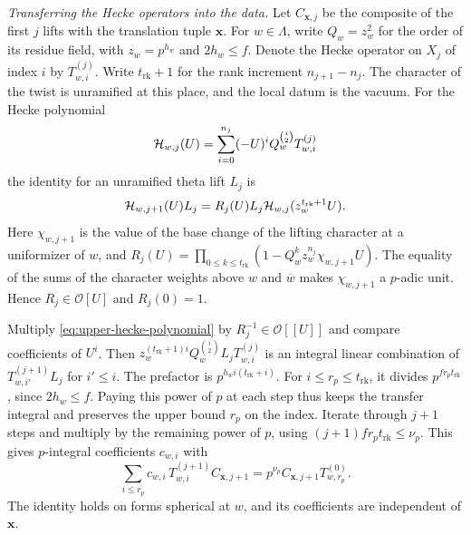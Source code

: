 \emph{Transferring the Hecke operators into the data.}
Let \(C_{\boldsymbol x,j}\) be the composite of the first \(j\) lifts
with the translation tuple \(\boldsymbol x\). For \(w\in\Lambda\),
write \(Q_w=z_w^2\) for the order of its residue field, with
\(z_w=p^{h_w}\) and \(2h_w\le f\). Denote the Hecke operator on
\(X_j\) of index \(i\) by \(T_{w,i}^{(j)}\).
Write \(t_\mathrm{rk}+1\) for the rank increment \(n_{j+1}-n_j\).
The character of the twist is unramified at this place, and the
local datum is the vacuum. For the Hecke polynomial
\[
 {\cal H}_{w,j}(U)=\sum_{i=0}^{n_j}(-U)^i Q_w^{\binom{i}{2}}T_{w,i}^{(j)}
\]
the identity for an unramified theta lift \(L_j\) is
\begin{equation}\label{eq:upper-hecke-polynomial}
 {\cal H}_{w,j+1}(U)L_j
    =R_j(U)L_j{\cal H}_{w,j}(z_w^{t_\mathrm{rk}+1}U).
\end{equation}
Here \(\chi_{w,j+1}\) is the value of the base change of the lifting
character at a uniformizer of \(w\), and
\(R_j(U)=\prod_{0\le k\le t_\mathrm{rk}}(1-Q_w^k z_w^{n_j}\chi_{w,j+1}U)\).
The equality of the sums of the character weights above \(w\) and
\(\overline w\) makes \(\chi_{w,j+1}\) a \(p\)-adic unit.
Hence \(R_j\in\mathcal O[U]\) and \(R_j(0)=1\).

Multiply \eqref{eq:upper-hecke-polynomial} by \(R_j^{-1}\in\mathcal O[[U]]\)
and compare coefficients of \(U^i\).
Then \(z_w^{(t_\mathrm{rk}+1)i}Q_w^{\binom{i}{2}}L_j T_{w,i}^{(j)}\)
is an integral linear combination of \(T_{w,i'}^{(j+1)}L_j\)
for \(i'\le i\).
The prefactor is \(p^{h_w i(t_\mathrm{rk}+i)}\).
For \(i\le r_p\le t_\mathrm{rk}\), it divides \(p^{f r_p t_\mathrm{rk}}\),
since \(2h_w\le f\). Paying this power of \(p\) at each step thus
keeps the transfer integral and preserves the upper bound \(r_p\)
on the index. Iterate through \(j+1\) steps and multiply by the
remaining power of \(p\), using \((j+1)f r_p t_\mathrm{rk}\le\nu_p\).
This gives \(p\)-integral coefficients \(c_{w,i}\) with
\begin{equation}\label{eq:upper-hecke-transfer}
 \sum_{i\le r_p}c_{w,i}\,T_{w,i}^{(j+1)}C_{\boldsymbol x,j+1}
       = p^{\nu_p} C_{\boldsymbol x,j+1} T_{w,r_p}^{(0)} .
\end{equation}
The identity holds on forms spherical at \(w\), and its coefficients
are independent of \(\boldsymbol x\).


